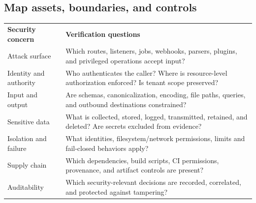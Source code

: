 \documentclass[11pt,letterpaper]{article}
\newcommand{\tablehead}[2]{\rowcolor{navy}\color{white}\textbf{#1}&\color{white}\textbf{#2}\\}
\begin{document}
\subsection{Map assets, boundaries, and controls}
\begin{center}
\end{center}

\noindent\begin{tabularx}{\linewidth}{@{}P{1.45in}Y@{}}
\tablehead{Security concern}{Verification questions}
Attack surface & Which routes, listeners, jobs, webhooks, parsers, plugins, and privileged operations accept input?\\
Identity and authority & Who authenticates the caller? Where is resource-level authorization enforced? Is tenant scope preserved?\\
Input and output & Are schemas, canonicalization, encoding, file paths, queries, and outbound destinations constrained?\\
Sensitive data & What is collected, stored, logged, transmitted, retained, and deleted? Are secrets excluded from evidence?\\
Isolation and failure & What identities, filesystem/network permissions, limits and fail-closed behaviors apply?\\
Supply chain & Which dependencies, build scripts, CI permissions, provenance, and artifact controls are present?\\
Auditability & Which security-relevant decisions are recorded, correlated, and protected against tampering?\\
\bottomrule
\end{tabularx}
\end{document}
